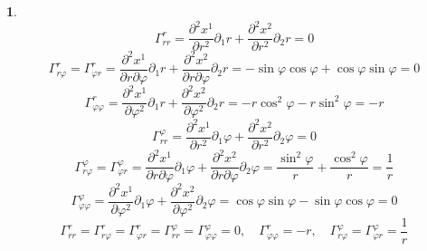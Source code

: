 \documentclass[12pt]{article}
\theoremstyle{definition}
\newtheorem{zad}{}[section]
\begin{document}
\begin{zad}
\begin{equation}
\end{equation}
\begin{equation}
    \Gamma^r_{rr}=\frac{\partial^2 x^1}{\partial r^2}\partial_1r+\frac{\partial^2 x^2}{\partial r^2}\partial_2r=0
\end{equation}
\begin{equation}
    \Gamma^r_{r\varphi}=\Gamma^r_{\varphi r}=\frac{\partial^2 x^1}{\partial r\partial\varphi}\partial_1 r+\frac{\partial^2 x^2}{\partial r\partial\varphi}\partial_2 r=-\sin\varphi\cos\varphi+\cos\varphi\sin\varphi=0
\end{equation}
\begin{equation}
    \Gamma^r_{\varphi\varphi}=\frac{\partial^2 x^1}{\partial\varphi^2}\partial_1r+\frac{\partial^2 x^2}{\partial \varphi^2}\partial_2r=-r\cos^2\varphi-r\sin^2\varphi=-r
\end{equation}
\begin{equation}
    \Gamma^\varphi_{rr}=\frac{\partial^2 x^1}{\partial r^2}\partial_1\varphi+\frac{\partial^2 x^2}{\partial r^2}\partial_2\varphi=0
\end{equation}
\begin{equation}
    \Gamma^\varphi_{r\varphi}=\Gamma^\varphi_{\varphi r}=\frac{\partial^2 x^1}{\partial r\partial\varphi}\partial_1\varphi+\frac{\partial^2 x^2}{\partial r\partial\varphi}\partial_2\varphi=\frac{\sin^2\varphi}{r}+\frac{\cos^2\varphi}{r}=\frac{1}{r}
\end{equation}
\begin{equation}
    \Gamma^\varphi_{\varphi\varphi}=\frac{\partial^2 x^1}{\partial\varphi^2}\partial_1\varphi+\frac{\partial^2 x^2}{\partial \varphi^2}\partial_2\varphi=\cos\varphi\sin\varphi-\sin\varphi\cos\varphi=0
\end{equation}
\begin{equation}
    \boxed{\Gamma^r_{rr}=\Gamma^r_{r\varphi}=\Gamma^r_{\varphi r}=\Gamma^\varphi_{rr}=\Gamma^\varphi_{\varphi\varphi}=0,\quad\Gamma^r_{\varphi\varphi}=-r,\quad\Gamma^\varphi_{r\varphi}=\Gamma^\varphi_{\varphi r}=\frac{1}{r}}
\end{equation}
\end{zad}
\end{document}
